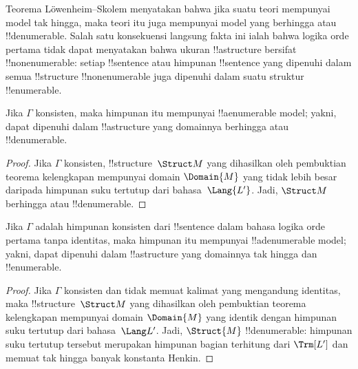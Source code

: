 \documentclass[../../../include/open-logic-section]{subfiles}
\begin{document}

Teorema L\"owenheim--Skolem menyatakan bahwa jika suatu teori mempunyai
model tak hingga, maka teori itu juga mempunyai model yang berhingga atau
!!{denumerable}. Salah satu konsekuensi langsung fakta ini ialah bahwa
logika orde pertama tidak dapat menyatakan bahwa ukuran !!a{structure}
bersifat !!{nonenumerable}: setiap !!{sentence} atau himpunan
!!{sentence} yang dipenuhi dalam semua !!{structure} !!{nonenumerable}
juga dipenuhi dalam suatu struktur !!{enumerable}.

\begin{thm}
 Jika $\Gamma$ konsisten, maka himpunan itu
mempunyai !!a{enumerable} model; yakni, dapat dipenuhi dalam
!!a{structure} yang domainnya berhingga atau !!{denumerable}.
\end{thm}

\begin{proof}
Jika $\Gamma$ konsisten, !!{structure}~$\Struct M$ yang dihasilkan oleh
pembuktian teorema kelengkapan mempunyai domain $\Domain{M}$ yang tidak
lebih besar daripada himpunan suku tertutup dari bahasa~$\Lang{L'}$.
Jadi, $\Struct M$ berhingga atau !!{denumerable}.
\end{proof}

\begin{thm}
 Jika $\Gamma$ adalah himpunan konsisten dari
!!{sentence} dalam bahasa logika orde pertama tanpa identitas, maka
himpunan itu mempunyai !!a{denumerable} model; yakni, dapat dipenuhi
dalam !!a{structure} yang domainnya tak hingga dan !!{enumerable}.
\end{thm}

\begin{proof}
Jika $\Gamma$ konsisten dan tidak memuat kalimat yang mengandung
identitas, maka !!{structure}~$\Struct M$ yang dihasilkan oleh pembuktian
teorema kelengkapan mempunyai domain $\Domain{M}$ yang identik dengan
himpunan suku tertutup dari bahasa~$\Lang L'$. Jadi, $\Struct{M}$
!!{denumerable}: himpunan suku tertutup tersebut merupakan himpunan
bagian terhitung dari $\Trm[L']$ dan memuat tak hingga banyak konstanta
Henkin.
\end{proof}
\end{document}
